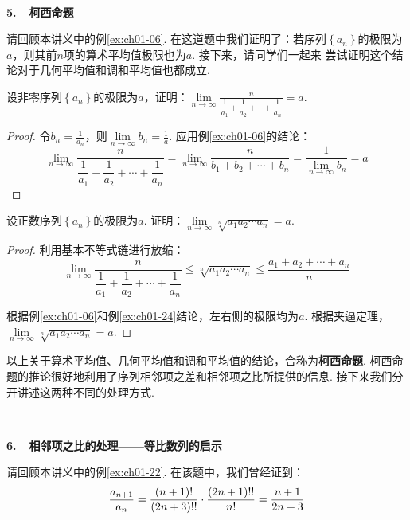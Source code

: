 ~\par
\textbf{5.~~柯西命题}\vspace{0.5em}

请回顾本讲义中的例\ref{ex:ch01-06}. 在这道题中我们证明了：若序列$\left\{ a_{n}\right\}$的极限为$a$，则其前$n$项的算术平均值极限也为$a$. 接下来，请同学们一起来
尝试证明这个结论对于几何平均值和调和平均值也都成立.

\begin{example}
\label{ex:ch01-24}
设非零序列$\left\{ a_{n}\right\}$的极限为$a$，证明：$\lim\limits_{n \to \infty}\displaystyle\frac{n}{\dfrac{1}{a_{1}}+\dfrac{1}{a_{2}}+\cdots +\dfrac{1}{a_{n}}}=a$.
\end{example}

\begin{proof}
令$b_{n}=\displaystyle\frac{1}{a_{n}}$，则$\lim\limits_{n \to \infty}b_{n}=\displaystyle\frac{1}{a}$. 应用例\ref{ex:ch01-06}的结论：
$$
\lim\limits_{n \to \infty}\displaystyle\frac{n}{\dfrac{1}{a_{1}}+\dfrac{1}{a_{2}}+\cdots +\dfrac{1}{a_{n}}} = \lim\limits_{n \to \infty}\displaystyle\frac{n}{b_{1}+b_{2}+\cdots +b_{n}}=\frac{1}{\lim\limits_{n \to \infty}b_{n}}=a
$$
\end{proof}

\begin{example}
\label{ex:ch01-25}
设正数序列$\left\{ a_{n}\right\}$的极限为$a$. 证明：$\lim\limits_{n \to \infty}\sqrt[n]{a_{1}a_{2}\cdots a_{n}}=a$.
\end{example}

\begin{proof}
利用基本不等式链进行放缩：
$$
\lim\limits_{n \to \infty}\displaystyle\frac{n}{\dfrac{1}{a_{1}}+\dfrac{1}{a_{2}}+\cdots +\dfrac{1}{a_{n}}}
\le \sqrt[n]{a_{1}a_{2}\cdots a_{n}} \le \frac{a_{1}+a_{2}+\cdots +a_{n}}{n}
$$

根据例\ref{ex:ch01-06}和例\ref{ex:ch01-24}结论，左右侧的极限均为$a$. 根据夹逼定理，$\lim\limits_{n \to \infty}\sqrt[n]{a_{1}a_{2}\cdots a_{n}}=a$.
\end{proof}

以上关于算术平均值、几何平均值和调和平均值的结论，合称为\textbf{柯西命题}. 柯西命题的推论很好地利用了序列相邻项之差和相邻项之比所提供的信息. 接下来我们分开讲述这两种不同的处理方式. \par
~\par
\textbf{6.~~相邻项之比的处理——等比数列的启示}\vspace{0.25em}

请回顾本讲义中的例\ref{ex:ch01-22}. 在该题中，我们曾经证到：
$$
\setlength\abovedisplayskip{10pt}
\setlength\belowdisplayskip{10pt}
\frac{a_{n+1}}{a_{n}} = \frac{(n+1)!}{(2n+3)!!} \cdot \frac{(2n+1)!!}{n!} = \frac{n+1}{2n+3}
$$

